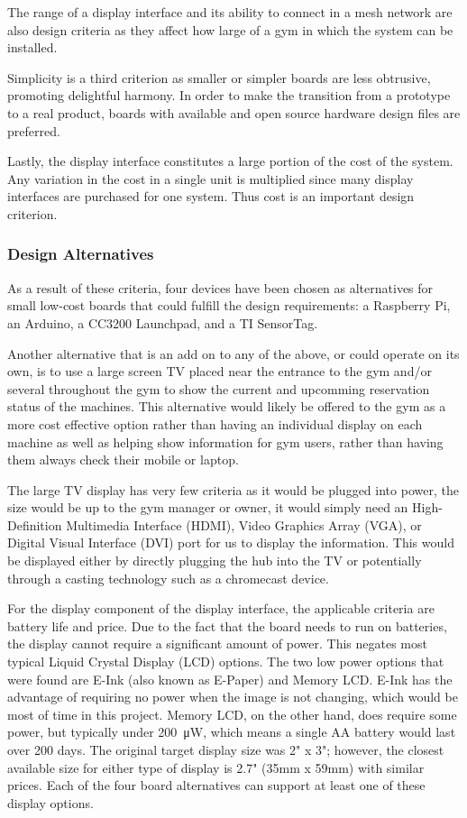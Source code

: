 \documentclass[PPFS.tex]{template/subfiles}
\begin{document}
The range of a display interface and its ability to connect in a mesh network are also design criteria as they affect how large of a gym in which the system can be installed.

Simplicity is a third criterion as smaller or simpler boards are less obtrusive, promoting delightful harmony. In order to make the transition from a prototype to a real product, boards with available and open source hardware design files are preferred.

Lastly, the display interface constitutes a large portion of the cost of the system. Any variation in the cost in a single unit is multiplied since many display interfaces are purchased for one system. Thus cost is an important design criterion.

\subsubsection{Design Alternatives}

As a result of these criteria, four devices have been chosen as alternatives for small low-cost boards that could fulfill the design requirements: a Raspberry Pi, an Arduino, a CC3200 Launchpad, and a TI SensorTag. 

Another alternative that is an add on to any of the above, or could operate on its own, is to use a large screen TV placed near the entrance to the gym and/or several throughout the gym to show the current and upcomming reservation status of the machines. This alternative would likely be offered to the gym as a more cost effective option rather than having an individual display on each machine as well as helping show information for gym users, rather than having them always check their mobile or laptop. 

The large TV display has very few criteria as it would be plugged into power, the size would be up to the gym manager or owner, it would simply need an High-Definition Multimedia Interface (HDMI), Video Graphics Array (VGA), or Digital Visual Interface (DVI) port for us to display the information. This would be displayed either by directly plugging the hub into the TV or potentially through a casting technology such as a chromecast device.

For the display component of the display interface, the applicable criteria are battery life and price. Due to the fact that the board needs to run on batteries, the display cannot require a significant amount of power. This negates most typical Liquid Crystal Display (LCD) options. The two low power options that were found are E-Ink (also known as E-Paper) and Memory LCD. E-Ink has the advantage of requiring no power when the image is not changing, which would be most of time in this project. Memory LCD, on the other hand, does require some power, but typically under \SI{200}{\micro\watt}, which means a single AA battery would last over 200 days. The original target display size was 2" x 3"; however, the closest available size for either type of display is 2.7" (35mm x 59mm) with similar prices. Each of the four board alternatives can support at least one of these display options.
\end{document}
